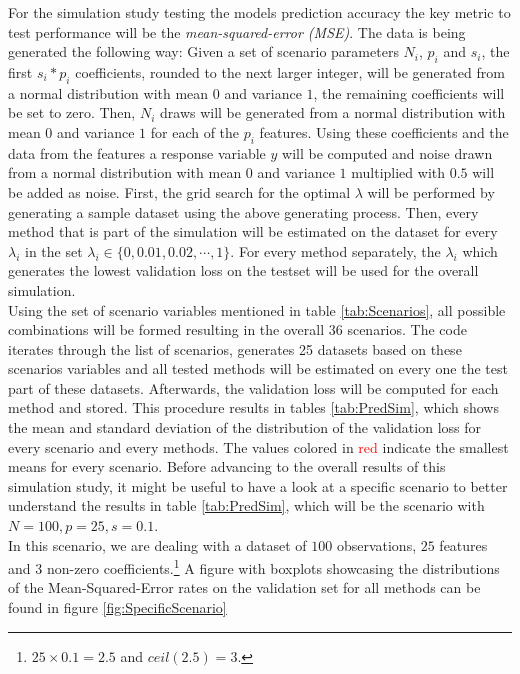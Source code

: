 \documentclass[12pt,a4paper]{article}
\begin{document}
For the simulation study testing the models prediction accuracy the key metric to test performance will be the \textit{mean-squared-error (MSE)}. The data is being generated the following way: Given a set of scenario parameters $N_i$, $p_i$ and $s_i$, the first $s_i*p_i$ coefficients, rounded to the next larger integer, will be generated from a normal distribution with mean $0$ and variance $1$, the remaining coefficients will be set to zero. Then, $N_i$ draws will be generated from a normal distribution with mean $0$ and variance $1$ for each of the $p_i$ features. Using these coefficients and the data from the features a response variable $y$ will be computed and noise drawn from a normal distribution with mean $0$ and variance $1$ multiplied with $0.5$ will be added as noise. First, the grid search for the optimal $\lambda$ will be performed by generating a sample dataset using the above generating process. Then, every method that is part of the simulation will be estimated on the dataset for every $\lambda_i$ in the set $\lambda_i \in \{0, 0.01, 0.02, \cdots, 1\}$. For every method separately, the $\lambda_i$ which generates the lowest validation loss on the testset will be used for the overall simulation.\\

Using the set of scenario variables mentioned in table \ref{tab:Scenarios}, all possible combinations will be formed resulting in the overall $36$ scenarios. The code iterates through the list of scenarios, generates 25 datasets based on these scenarios variables and all tested methods will be estimated on every one the test part of these datasets. Afterwards, the validation loss will be computed for each method and stored. This procedure results in tables \ref{tab:PredSim}, which shows the mean and standard deviation of the distribution of the validation loss for every scenario and every methods. The values colored in \textcolor{red}{red} indicate the smallest means for every scenario. Before advancing to the overall results of this simulation study, it might be useful to have a look at a specific scenario to better understand the results in table \ref{tab:PredSim}, which will be the scenario with $N=100, p=25, s=0.1$.\\

In this scenario, we are dealing with a dataset of $100$ observations, $25$ features and $3$ non-zero coefficients.\footnote{$25 \times 0.1 = 2.5$ and $ceil(2.5)=3$.} A figure with boxplots showcasing the distributions of the Mean-Squared-Error rates on the validation set for all methods can be found in figure \ref{fig:SpecificScenario}
\end{document}
